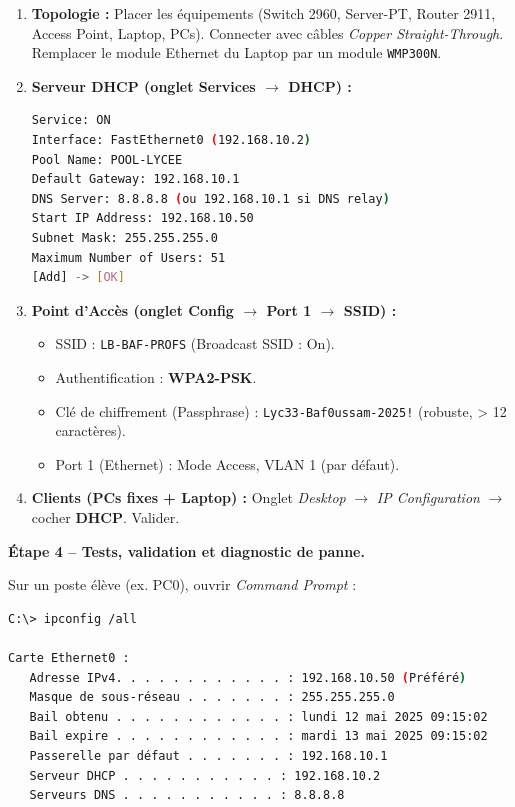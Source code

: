 \documentclass[11pt]{article}
\begin{document}
\begin{exoresolu}
\begin{enumerate}
\item \textbf{Topologie :} Placer les équipements (Switch 2960, Server-PT, Router 2911, Access Point, Laptop, PCs). Connecter avec câbles \emph{Copper Straight-Through}. Remplacer le module Ethernet du Laptop par un module \texttt{WMP300N}.
\item \textbf{Serveur DHCP (onglet Services $\rightarrow$ DHCP) :}
\begin{lstlisting}[language=bash, caption=Configuration DHCP sur Server-PT]
Service: ON
Interface: FastEthernet0 (192.168.10.2)
Pool Name: POOL-LYCEE
Default Gateway: 192.168.10.1
DNS Server: 8.8.8.8 (ou 192.168.10.1 si DNS relay)
Start IP Address: 192.168.10.50
Subnet Mask: 255.255.255.0
Maximum Number of Users: 51
[Add] -> [OK]
\end{lstlisting}
\item \textbf{Point d'Accès (onglet Config $\rightarrow$ Port 1 $\rightarrow$ SSID) :}
\begin{itemize}
\item SSID : \texttt{LB-BAF-PROFS} (Broadcast SSID : On).
\item Authentification : \textbf{WPA2-PSK}.
\item Clé de chiffrement (Passphrase) : \texttt{Lyc33-Baf0ussam-2025!} (robuste, > 12 caractères).
\item Port 1 (Ethernet) : Mode Access, VLAN 1 (par défaut).
\end{itemize}
\item \textbf{Clients (PCs fixes + Laptop) :} Onglet \emph{Desktop} $\rightarrow$ \emph{IP Configuration} $\rightarrow$ cocher \textbf{DHCP}. Valider.
\end{enumerate}

\textbf{Étape 4 -- Tests, validation et diagnostic de panne.}

Sur un poste élève (ex. PC0), ouvrir \emph{Command Prompt} :

\begin{lstlisting}[language=bash, caption=Vérification IP et connectivité]
C:\> ipconfig /all

Carte Ethernet0 :
   Adresse IPv4. . . . . . . . . . . . : 192.168.10.50 (Préféré)
   Masque de sous-réseau . . . . . . . : 255.255.255.0
   Bail obtenu . . . . . . . . . . . . : lundi 12 mai 2025 09:15:02
   Bail expire . . . . . . . . . . . . : mardi 13 mai 2025 09:15:02
   Passerelle par défaut . . . . . . . : 192.168.10.1
   Serveur DHCP . . . . . . . . . . . : 192.168.10.2
   Serveurs DNS . . . . . . . . . . . : 8.8.8.8


\end{lstlisting}
\end{exoresolu}
\end{document}
